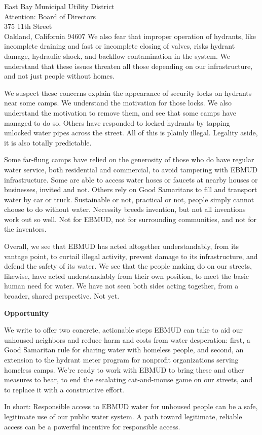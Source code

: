 \documentclass[letterpaper]{letter}
\begin{document}
\begin{letter}{%
    East Bay Municipal Utility District\\
    Attention: Board of Directors\\
    375 11th Street\\
    Oakland, California 94607}
    We also fear that improper operation of hydrants, like incomplete draining and fast or incomplete closing of valves, risks hydrant damage, hydraulic shock, and backflow contamination in the system. We understand that these issues threaten all those depending on our infrastructure, and not just people without homes.

    We suspect these concerns explain the appearance of security locks on hydrants near some camps. We understand the motivation for those locks. We also understand the motivation to remove them, and see that some camps have managed to do so. Others have responded to locked hydrants by tapping unlocked water pipes across the street. All of this is plainly illegal. Legality aside, it is also totally predictable.

    Some far-flung camps have relied on the generosity of those who do have regular water service, both residential and commercial, to avoid tampering with EBMUD infrastructure. Some are able to access water hoses or faucets at nearby houses or businesses, invited and not. Others rely on Good Samaritans to fill and transport water by car or truck. Sustainable or not, practical or not, people simply cannot choose to do without water. Necessity breeds invention, but not all inventions work out so well. Not for EBMUD, not for surrounding communities, and not for the inventors.

    Overall, we see that EBMUD has acted altogether understandably, from its vantage point, to curtail illegal activity, prevent damage to its infrastructure, and defend the safety of its water. We see that the people making do on our streets, likewise, have acted understandably from their own position, to meet the basic human need for water. We have not seen both sides acting together, from a broader, shared perspective. Not yet.

    \stopbreaks
    \textbf{Opportunity}

    We write to offer two concrete, actionable steps EBMUD can take to aid our unhoused neighbors and reduce harm and costs from water desperation: first, a Good Samaritan rule for sharing water with homeless people, and second, an extension to the hydrant meter program for nonprofit organizations serving homeless camps. We’re ready to work with EBMUD to bring these and other measures to bear, to end the escalating cat-and-mouse game on our streets, and to replace it with a constructive effort.
    \startbreaks

    In short: Responsible access to EBMUD water for unhoused people can be a safe, legitimate use of our public water system. A path toward legitimate, reliable access can be a powerful incentive for responsible access.


\end{letter}
\end{document}

